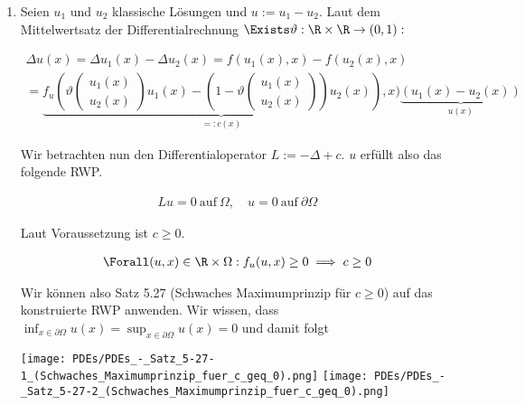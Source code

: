 \begin{solution}

\phantom{}

\begin{enumerate}[label = (\alph*)]

  \item Seien $u_1$ und $u_2$ klassische Lösungen und $u := u_1 - u_2$.
  Laut dem Mittelwertsatz der Differentialrechnung $\Exists \vartheta: \R \times \R \to (0, 1):$

  \begin{multline*}
    \Delta u(x)
    =
    \Delta u_1(x) - \Delta u_2(x)
    =
    f(u_1(x), x) - f(u_2(x), x) \\
    =
    \underbrace
    {
      f_u(\vartheta\begin{pmatrix}u_1(x) \\ u_2(x)\end{pmatrix} u_1(x) - \left(1 - \vartheta \begin{pmatrix}u_1(x) \\ u_2(x)\end{pmatrix}\right) u_2(x)), x)
    }_{
      =: c(x)
    }
    \underbrace
    {
      (u_1(x) - u_2(x))
    }_{
      u(x)
    }
  \end{multline*}

  Wir betrachten nun den Differentialoperator $L := -\Delta + c$.
  $u$ erfüllt also das folgende RWP.

  \begin{align*}
    Lu = 0 ~\text{auf}~ \Omega,
    \quad
    u = 0 ~\text{auf}~ \partial \Omega
  \end{align*}

  Laut Voraussetzung ist $c \geq 0$.

  \begin{align*}
    \Forall (u, x) \in \R \times \Omega:
    f_u(u, x) \geq 0
    \implies
    c \geq 0
  \end{align*}

  Wir können also Satz 5.27 (Schwaches Maximumprinzip für $c \geq 0$) auf das konstruierte RWP anwenden.
  Wir wissen, dass $\inf_{x \in \partial \Omega} u(x)
  =
  \sup_{x \in \partial \Omega} u(x)
  =
  0 $ und damit folgt


  \begin{center}
    \texttt{[image: PDEs/PDEs\_-\_Satz\_5-27-1\_(Schwaches\_Maximumprinzip\_fuer\_c\_geq\_0).png]}
    \texttt{[image: PDEs/PDEs\_-\_Satz\_5-27-2\_(Schwaches\_Maximumprinzip\_fuer\_c\_geq\_0).png]}
  \end{center}


\end{enumerate}
\end{solution}
